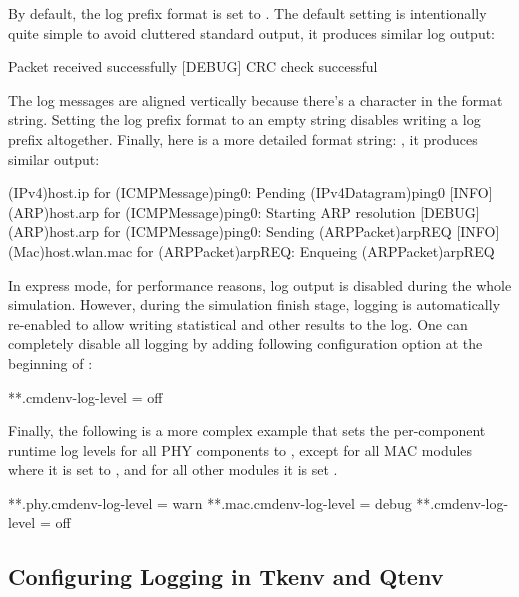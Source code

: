 By default, the log prefix format is set to . The
default setting is intentionally quite simple to avoid cluttered standard output,
it produces similar log output:

\begin{filelisting}
[INFO]  Packet received successfully
[DEBUG] CRC check successful
\end{filelisting}

The log messages are aligned vertically because there's a  character
in the format string. Setting the log prefix format to an empty string disables
writing a log prefix altogether. Finally, here is a more detailed format string:
, it produces similar output:

\begin{filelisting}
[INFO]  (IPv4)host.ip for (ICMPMessage)ping0:     Pending (IPv4Datagram)ping0
[INFO]  (ARP)host.arp for (ICMPMessage)ping0:     Starting ARP resolution
[DEBUG] (ARP)host.arp for (ICMPMessage)ping0:     Sending (ARPPacket)arpREQ
[INFO]  (Mac)host.wlan.mac for (ARPPacket)arpREQ: Enqueing (ARPPacket)arpREQ
\end{filelisting}

In express mode, for performance reasons, log output is disabled during the whole
simulation. However, during the simulation finish stage, logging is automatically
re-enabled to allow writing statistical and other results to the log. One can
completely disable all logging by adding following configuration option at the
beginning of :

\begin{inifile}
[General]
**.cmdenv-log-level = off
\end{inifile}

Finally, the following is a more complex example that sets the per-component
runtime log levels for all PHY components to , except for
all MAC modules where it is set to , and for all other
modules it is set .

\begin{inifile}
[General]
**.phy.cmdenv-log-level = warn
**.mac.cmdenv-log-level = debug
**.cmdenv-log-level = off
\end{inifile}

\subsection{Configuring Logging in Tkenv and Qtenv}
\label{sec:config-sim:configuring-logging-in-tkenv-and-qtenv}

